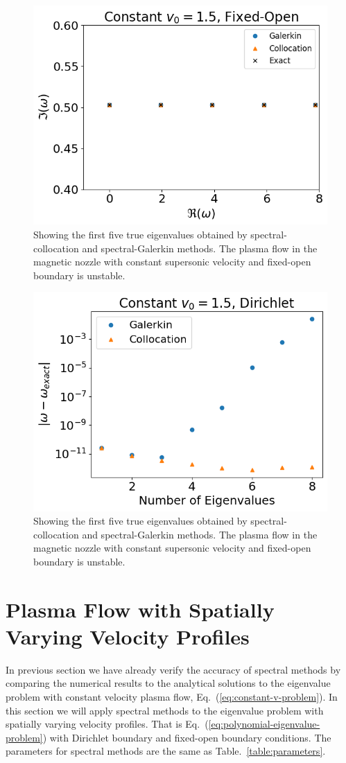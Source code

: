 \begin{figure}[htbp]
	\centering
	\includegraphics[width=0.7\linewidth]{figures/constant-supersonic-fixed-open.png}
	\caption{Showing the first five true eigenvalues obtained by spectral-collocation and spectral-Galerkin methods. The plasma flow in the magnetic nozzle with constant supersonic velocity and fixed-open boundary is unstable.}
	\label{fig:constant-supersonic-fixed-open}
\end{figure}

\begin{figure}[htbp]
	\centering
	\includegraphics[width=0.7\linewidth]{figures/errors-constant-supersonic-fixed-open.png}
	\caption{Showing the first five true eigenvalues obtained by spectral-collocation and spectral-Galerkin methods. The plasma flow in the magnetic nozzle with constant supersonic velocity and fixed-open boundary is unstable.}
	\label{fig:errors-constant-supersonic-fixed-open}
\end{figure}

\section{Plasma Flow with Spatially Varying Velocity Profiles}
In previous section we have already verify the accuracy of spectral methods by comparing the numerical results to the analytical solutions to the eigenvalue problem with constant velocity plasma flow, Eq.~(\ref{eq:constant-v-problem}). In this section we will apply spectral methods to the eigenvalue problem with spatially varying velocity profiles. That is Eq.~(\ref{eq:polynomial-eigenvalue-problem}) with Dirichlet boundary and fixed-open boundary conditions. The parameters for spectral methods are the same as Table.~\ref{table:parameters}.

